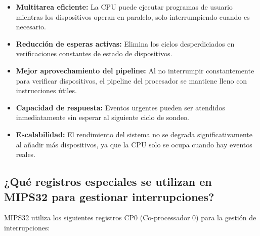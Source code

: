 \documentclass[12pt]{article}
\begin{document}
	\begin{itemize}
		\item \textbf{Multitarea eficiente:} La CPU puede ejecutar programas de usuario mientras los dispositivos operan en paralelo, solo interrumpiendo cuando es necesario.
		
		\item \textbf{Reducción de esperas activas:} Elimina los ciclos desperdiciados en verificaciones constantes de estado de dispositivos.
		
		\item \textbf{Mejor aprovechamiento del pipeline:} Al no interrumpir constantemente para verificar dispositivos, el pipeline del procesador se mantiene lleno con instrucciones útiles.
		
		\item \textbf{Capacidad de respuesta:} Eventos urgentes pueden ser atendidos inmediatamente sin esperar al siguiente ciclo de sondeo.
		
		\item \textbf{Escalabilidad:} El rendimiento del sistema no se degrada significativamente al añadir más dispositivos, ya que la CPU solo se ocupa cuando hay eventos reales.
	\end{itemize}
	
	\subsection{¿Qué registros especiales se utilizan en MIPS32 para gestionar interrupciones?}
	
	MIPS32 utiliza los siguientes registros CP0 (Co-processador 0) para la gestión de interrupciones:
	
\end{document}
